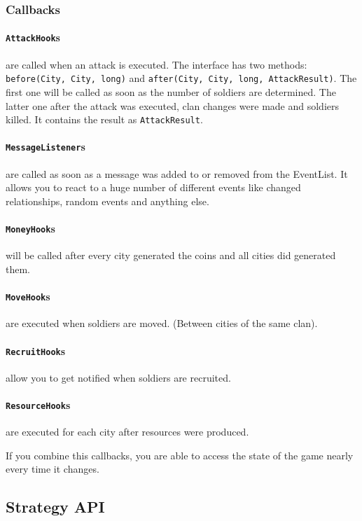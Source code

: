 \documentclass{article}
\begin{document}
\subsubsection{Callbacks}
\paragraph{\texttt{AttackHook}s} are called when an attack is executed. The interface has two methods: \texttt{before(City, City, long)} and \texttt{after(City, City, long, AttackResult)}. The first one will
be called as soon as the number of soldiers are determined. The latter one after the attack was executed, clan changes were made and soldiers killed. It contains the result as \texttt{AttackResult}.
\paragraph{\texttt{MessageListener}s} are called as soon as a message was added to or removed from the EventList. It allows you to react to a huge number of different events like changed relationships, random events and anything else.
\paragraph{\texttt{MoneyHook}s} will be called after every city generated the coins and all cities did generated them.
\paragraph{\texttt{MoveHook}s} are executed when soldiers are moved. (Between cities of the same clan).  
\paragraph{\texttt{RecruitHook}s} allow you to get notified when soldiers are recruited.
\paragraph{\texttt{ResourceHook}s} are executed for each city after resources were produced.\newline

If you combine this callbacks, you are able to access the state of the game nearly every time it changes.
\subsection{Strategy API}
\end{document}
